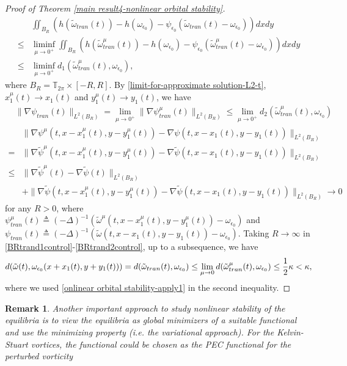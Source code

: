 \documentclass[1 [leqno, 11pt]{amsart}
\numberwithin{equation}{section}
\let\ep=\epsilon
\newtheorem{remark}[Theorem]{Remark}
\begin{document}
\begin{CJK*}{GBK}{song}
\begin{proof}[Proof of  Theorem \ref{main result4-nonlinear orbital stability}]
\begin{align}\nonumber
&\iint_{B_R}\left(h(\tilde \omega_{tran}(t)) - h(\omega_{\ep_0})  - \psi_{\ep_0} (\tilde \omega_{tran}(t)-\omega_{\ep_0})\right)dxdy\\\nonumber
\leq& \liminf_{\mu\to0^+}\iint_{B_R}(h(\tilde \omega_{tran}^\mu(t)) - h(\omega_{\ep_0}) - \psi_{\ep_0} (\tilde \omega_{tran}^\mu(t)
-\omega_{\ep_0}))dxdy\\\label{BRtrand1control}
\leq& \liminf_{\mu\to0^+} d_1(\tilde \omega_{tran}^\mu(t),\omega_{\ep_0}),
\end{align}
where $B_R=\mathbb{T}_{2\pi}\times [-R,R]$. By \eqref{limit-for-approximate solution-L2-t},  $x_1^\mu(t)\to x_1(t)$ and $y_1^\mu(t)\to y_1(t)$, we have
\begin{align}\label{BRtrand2control}
&\|\nabla\psi_{tran}(t)\|_{L^2(B_R)}=\lim_{\mu\to0^+}
\|\nabla\psi_{tran}^\mu(t)\|_{L^2(B_R)}
\leq\lim_{\mu\to0^+} d_2(\tilde \omega_{tran}^\mu(t),\omega_{\ep_0})
\end{align}
\begin{align*}
&\|\nabla\psi^\mu(t,x-x_1^\mu(t),y-y_1^\mu(t))-\nabla\psi(t,x-x_1(t),y-y_1(t))\|_{L^2(B_R)}\\
=&\|\nabla\tilde \psi^\mu(t,x-x_1^\mu(t),y-y_1^\mu(t))-\nabla\tilde \psi(t,x-x_1(t),y-y_1(t))\|_{L^2(B_R)}\\
\leq& \|\nabla\tilde \psi^\mu(t)-\nabla\tilde \psi(t)\|_{L^2(B_R)}\\
&+\|\nabla\tilde \psi(t,x-x_1^\mu(t),y-y_1^\mu(t))-\nabla\tilde \psi(t,x-x_1(t),y-y_1(t))\|_{L^2(B_R)}\to0
\end{align*}
\fi
 for any $R>0$, where
$\psi_{tran}^\mu(t)\triangleq(-\Delta)^{-1}(\tilde \omega^\mu(t,x-x_1^\mu(t),y-y_1^\mu(t))-\omega_{\ep_0})$ and $\psi_{tran}(t)\triangleq(-\Delta)^{-1}(\tilde \omega(t,x-x_1(t),y-y_1(t))-\omega_{\ep_0})$. Taking $R\to\infty$ in
\eqref{BRtrand1control}-\eqref{BRtrand2control}, up to a subsequence, we have
\begin{align*}
d(\tilde \omega(t),\omega_{\ep_0}(x+x_1(t),y+y_1(t)))=d(\tilde \omega_{tran}(t),\omega_{\ep_0})\leq \lim_{\mu\to0}d(\tilde \omega_{tran}^\mu(t),\omega_{\ep_0})\leq {1\over 2}\kappa<\kappa,
\end{align*}
where we used \eqref{onlinear orbital stability-apply1} in the second inequality.
\end{proof}
\begin{remark}
Another important approach to study nonlinear stability of the equilibria is to view the  equilibria as global minimizers of a suitable functional  and use the minimizing property (i.e. the variational approach). For the Kelvin-Stuart vortices, the functional could be chosen as the PEC functional for the perturbed vorticity

\end{remark}
\end{CJK*}
\end{document}
